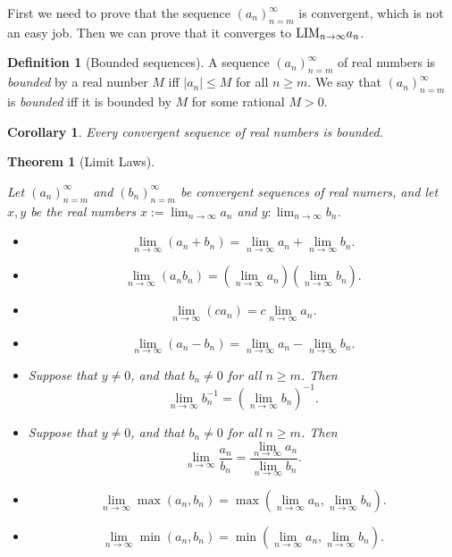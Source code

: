 \documentclass[
]{book}
\providecommand{\tightlist}{%
  \setlength{\itemsep}{0pt}\setlength{\parskip}{0pt}}
\newtheorem{theorem}{Theorem}[chapter]
\newtheorem{corollary}{Corollary}[chapter]
\theoremstyle{definition}
\newtheorem{definition}{Definition}[chapter]
\theoremstyle{definition}
\theoremstyle{definition}
\theoremstyle{definition}
\theoremstyle{remark}
\begin{document}
First we need to prove that the sequence \((a_n)_{n=m}^{\infty}\) is convergent, which is not an easy job. Then we can prove that it converges to \({\rm LIM}_{n\to \infty}a_n\).

\begin{definition}[Bounded sequences]
A sequence \((a_n)_{n=m}^{\infty}\) of real numbers is \emph{bounded} by a real number \(M\) iff \(|a_n|\leq M\) for all \(n\geq m\). We say that \((a_n)_{n=m}^{\infty}\) is \emph{bounded} iff it is bounded by \(M\) for some rational \(M>0\).
\end{definition}

\begin{corollary}
Every convergent sequence of real numbers is bounded.
\end{corollary}

\begin{theorem}[Limit Laws]
\protect\hypertarget{thm:law}{}\label{thm:law}

Let \((a_n)_{n=m}^{\infty}\) and \((b_n)_{n=m}^{\infty}\) be convergent sequences of real numers, and let \(x,y\) be the real numbers \(x:=\lim_{n\to\infty} a_n\) and \(y:\lim_{n\to\infty} b_n\).

\begin{itemize}
\tightlist
\item
  \[\lim_{n\to\infty}(a_n+b_n)=\lim_{n\to\infty}a_n+\lim_{n\to\infty}b_n.\]
\item
  \[\lim_{n\to\infty}(a_nb_n)=(\lim_{n\to\infty}a_n)(\lim_{n\to\infty}b_n).\]
\item
  \[\lim_{n\to\infty}(ca_n)=c\lim_{n\to\infty}a_n.\]
\item
  \[\lim_{n\to\infty}(a_n-b_n)=\lim_{n\to\infty}a_n-\lim_{n\to\infty}b_n.\]
\item
  Suppose that \(y\ne 0\), and that \(b_n\ne 0\) for all \(n\geq m\). Then
  \[
  \lim_{n\to\infty}b_n^{-1} = (\lim_{n\to\infty}b_n)^{-1}.
  \]
\item
  Suppose that \(y\ne 0\), and that \(b_n\ne 0\) for all \(n\geq m\). Then
  \[
  \lim_{n\to\infty}\frac{a_n}{b_n} = \frac{\lim_{n\to\infty}a_n}{\lim_{n\to\infty}b_n}.
  \]
\item
  \[\lim_{n\to\infty}\max(a_n,b_n)=\max(\lim_{n\to\infty}a_n,\lim_{n\to\infty}b_n).\]
\item
  \[\lim_{n\to\infty}\min(a_n,b_n)=\min(\lim_{n\to\infty}a_n,\lim_{n\to\infty}b_n).\]
\end{itemize}

\end{theorem}
\end{document}
